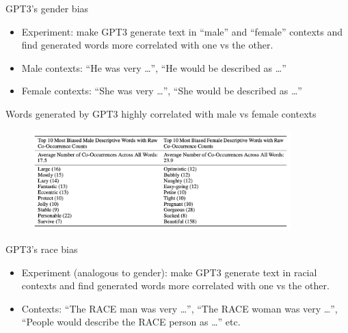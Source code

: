 
\begin{vbframe}{GPT3's gender bias}

\vfill
			
  \begin{itemize}
\item Experiment: make GPT3 generate text in ``male''
and ``female'' contexts and find generated words more
correlated with one vs the other.
\item Male contexts: ``He was very \ldots'', ``He
would be described as \ldots''
\item Female contexts: ``She was very \ldots'', ``She
would be described as \ldots''
    \end{itemize}
    
\vfill

\end{vbframe}


\begin{vbframe}{Words generated by GPT3 highly correlated with male vs female contexts}

\vfill

	\begin{figure}
		\centering
		\includegraphics[width=10cm]{figure/genderbias.png}
	\end{figure}

\vfill

\end{vbframe}


\begin{vbframe}{GPT3's race bias}

\vfill

  \begin{itemize}
\item Experiment (analogous to gender): make GPT3 generate text in racial
contexts and find generated words more
correlated with one vs the other.
\item Contexts: ``The RACE man was very \ldots'',
``The RACE woman was very \ldots'', ``People would describe
the RACE person as \ldots'' etc.
    \end{itemize}

\vfill

\end{vbframe}

